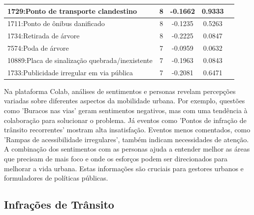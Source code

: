 \begin{table}[htbp]
\begin{tabular}{|l|c|c|c|c|}
		\hline
		1729:Ponto de transporte clandestino            & 8                & -0.1662        & 0.9333           \\
		\hline
		1711:Ponto de ônibus danificado                 & 8                & -0.1235        & 0.5263           \\
		\hline
		1734:Retirada de árvore                         & 8                & -0.2225        & 0.0847           \\
		\hline
		7574:Poda de árvore                             & 7                & -0.0959        & 0.0632           \\
		\hline
		10889:Placa de sinalização quebrada/inexistente & 7                & -0.1963        & 0.0843           \\
		\hline
		1733:Publicidade irregular em via pública       & 7                & -0.2081        & 0.6471           \\
		\hline
	\end{tabular}
\end{table}

Na plataforma Colab, análises de sentimentos e personas revelam percepções variadas sobre diferentes aspectos da mobilidade urbana. Por exemplo, questões como 'Buracos nas vias' geram sentimentos negativos, mas com uma tendência à colaboração para solucionar o problema. Já eventos como 'Pontos de infração de trânsito recorrentes' mostram alta insatisfação. Eventos menos comentados, como 'Rampas de acessibilidade irregulares', também indicam necessidades de atenção. A combinação dos sentimentos com as personas ajuda a entender melhor as áreas que precisam de mais foco e onde os esforços podem ser direcionados para melhorar a vida urbana. Estas informações são cruciais para gestores urbanos e formuladores de políticas públicas.

\subsection{Infrações de Trânsito}

